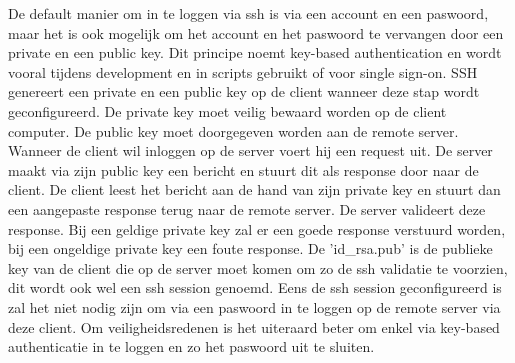             De default manier om in te loggen via ssh is via een account en een paswoord, maar het is ook mogelijk om het account en het paswoord te vervangen door een private en een public key. Dit principe noemt key-based authentication en wordt vooral tijdens development en in scripts gebruikt of voor single sign-on. SSH genereert een private en een public key op de client wanneer deze stap wordt geconfigureerd. De private key moet veilig bewaard worden op de client computer. De public key moet doorgegeven worden aan de remote server. Wanneer de client wil inloggen op de server voert hij een request uit. De server maakt via zijn public key een bericht en stuurt dit als response door naar de client. De client leest het bericht aan de hand van zijn private key en stuurt dan een aangepaste response terug naar de remote server. De server valideert deze response. Bij een geldige private key zal er een goede response verstuurd worden, bij een ongeldige private key een foute response.
            De 'id\_rsa.pub' is de publieke key van de client die op de server moet komen om zo de ssh validatie te voorzien, dit wordt ook wel een ssh session genoemd. Eens de ssh session geconfigureerd is zal het niet nodig zijn om via een paswoord in te loggen op de remote server via deze client.
            Om veiligheidsredenen is het uiteraard beter om enkel via key-based authenticatie in te loggen en zo het paswoord uit te sluiten.
%            
